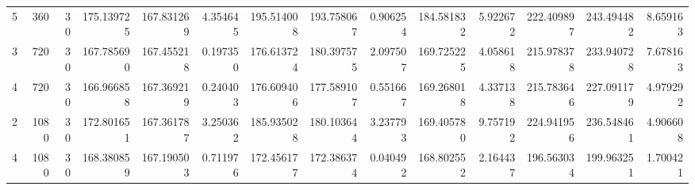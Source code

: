 \begin{tabular}{rrrrrrrrrrrrrr}
     5 &   360 &    30 &    175.139725 &  167.831269 &        4.354645 &     195.514008 &  193.758067 &             0.906254 &     184.581832 &                5.922672 &    222.409897 &  243.494482 &        8.659163 \\
     3 &   720 &    30 &    167.785690 &  167.455218 &        0.197350 &     176.613724 &  180.397575 &             2.097507 &     169.725225 &                4.058618 &    215.978378 &  233.940728 &        7.678163 \\
     4 &   720 &    30 &    166.966858 &  167.369219 &        0.240403 &     176.609406 &  177.589107 &             0.551667 &     169.268018 &                4.337138 &    215.783646 &  227.091179 &        4.979292 \\
     2 &  1080 &    30 &    172.801651 &  167.361787 &        3.250362 &     185.935028 &  180.103644 &             3.237793 &     169.405780 &                9.757192 &    224.941956 &  236.548461 &        4.906608 \\
     4 &  1080 &    30 &    168.380859 &  167.190503 &        0.711976 &     172.456177 &  172.386374 &             0.040492 &     168.802552 &                2.164437 &    196.563034 &  199.963251 &        1.700421 \\
\bottomrule
\end{tabular}
